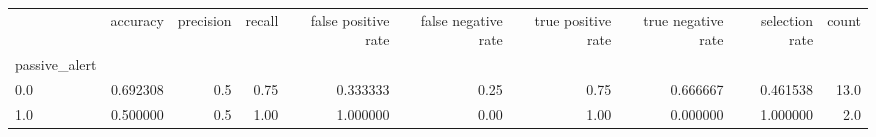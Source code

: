 \begin{tabular}{lrrrrrrrrr}
\toprule
{} &  accuracy &  precision &  recall &  false positive rate &  false negative rate &  true positive rate &  true negative rate &  selection rate &  count \\
passive\_alert &           &            &         &                      &                      &                     &                     &                 &        \\
\midrule
0.0           &  0.692308 &        0.5 &    0.75 &             0.333333 &                 0.25 &                0.75 &            0.666667 &        0.461538 &   13.0 \\
1.0           &  0.500000 &        0.5 &    1.00 &             1.000000 &                 0.00 &                1.00 &            0.000000 &        1.000000 &    2.0 \\
\bottomrule
\end{tabular}
